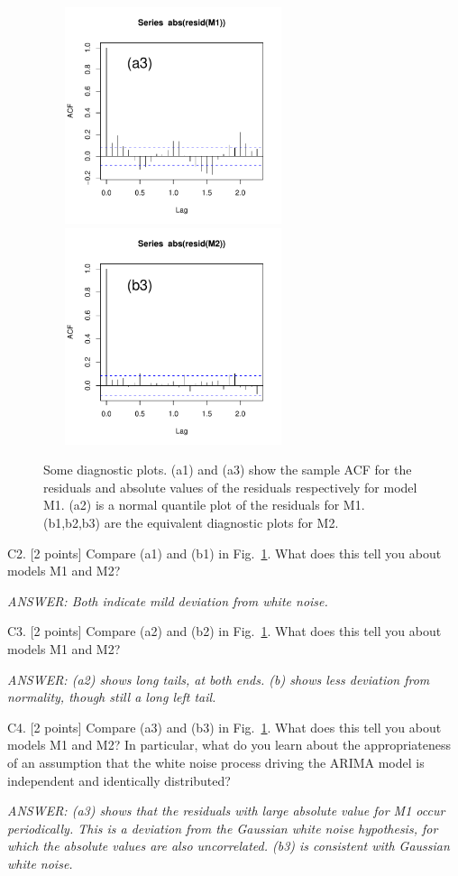 \documentclass[11pt]{article}
\def\qspace{\vspace{1.5in}}
\def\ans{\it ANSWER: }
\begin{document}
\begin{figure}[h]
\includegraphics[width=3in,height=2.5in]{m1-resid2}
\hfill\includegraphics[width=3in,height=2.5in]{m2-resid2}

\caption{
Some diagnostic plots. (a1) and (a3) show the sample ACF
for the residuals and absolute values of the residuals
respectively for model M1. (a2) is a normal quantile plot of the residuals for M1.
(b1,b2,b3) are the equivalent diagnostic plots for M2.
}\label{fig:diag}
\end{figure}


C2. [2 points] Compare (a1) and (b1) in Fig.~\ref{fig:diag}. What does this
tell you about models M1 and M2?

{\ans Both indicate mild deviation from white noise.}



C3. [2 points] Compare (a2) and (b2) in Fig.~\ref{fig:diag}. What does this
tell you about models M1 and M2?

{\ans (a2) shows long tails, at both ends. (b) shows less
deviation from normality, though still a long left tail.}


C4. [2 points] Compare (a3) and (b3) in Fig.~\ref{fig:diag}. What does this
tell you about models M1 and M2? In particular, what do you learn about the appropriateness of an assumption that the white noise process driving the ARIMA model is independent and identically distributed?

{\ans (a3) shows that the residuals with large absolute value for
M1 occur periodically. This is a deviation from the Gaussian
white noise hypothesis, for which the absolute values are also
uncorrelated. (b3) is consistent with   Gaussian
white noise.}

\end{document}
